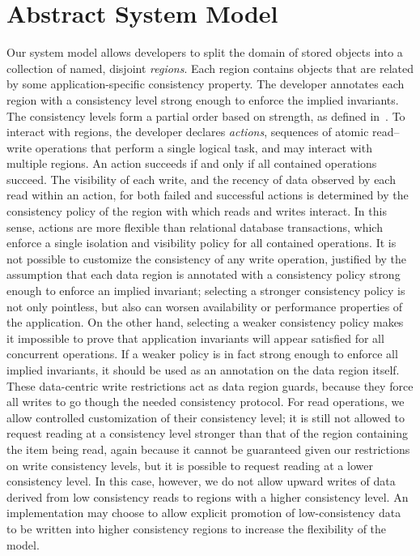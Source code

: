 \documentclass[preprint,numbers]{sigplanconf}
\begin{document}
\section{Abstract System Model}
\label{sec:model}
Our system model allows developers to split the domain of stored objects into a
collection of named, disjoint
\emph{regions}. Each
region contains objects that are related by some application-specific consistency property. The
developer annotates each region with a consistency level 
strong enough to enforce the implied invariants. The consistency levels form
a partial order
based on strength, as defined
in~\cite{sivaramakrishnan2015declarative}.
To interact with regions, the developer
declares \emph{actions}, sequences of atomic
read--write operations that perform a single logical task, and may interact with
multiple regions. An action succeeds if and only if all contained operations
succeed. The visibility of each write, and the recency of
data observed by each read within an action, for both failed and successful
actions is determined by the consistency policy of the region with which reads
and writes interact. In this sense, actions are more flexible than relational
database transactions, which enforce a single isolation and visibility policy for all contained
operations. It is not possible to customize the consistency of any write operation, justified
by the assumption that each data region is annotated with a consistency policy strong enough to enforce 
an implied invariant; selecting a stronger
consistency policy is not only pointless, but also can worsen
availability or performance properties of the application. On the other hand,
selecting a weaker consistency policy makes it impossible to prove that
application invariants will appear satisfied for all concurrent
operations. If a weaker policy is in fact strong enough to enforce all implied
invariants, it should be used as an annotation on the data region itself. 
These data-centric write restrictions act as data region guards, because they force all writes to go
though the needed consistency protocol. For read operations, we allow controlled customization of 
their consistency level; it is still not allowed to request reading
at a consistency level stronger than that of the region containing the item
being read, again because it cannot be guaranteed given our restrictions on
write consistency levels, but it is possible to
request reading at a lower consistency level. In this case, however, we do not allow
upward writes of data derived from low
consistency reads to regions with a higher consistency level. An implementation may choose to
allow explicit promotion of low-consistency data to be written into higher
consistency regions to increase the flexibility of the model.
\end{document}
